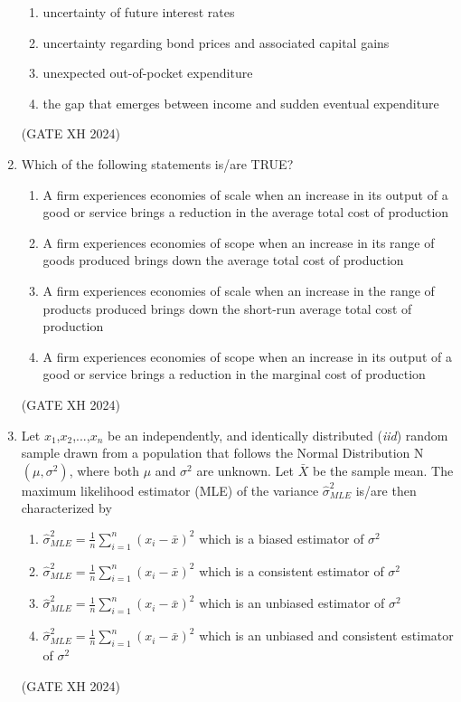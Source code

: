 \documentclass{article}
\begin{document}
\begin{enumerate}
    \begin{enumerate}
        \item uncertainty of future interest rates
        \item  uncertainty regarding bond prices and associated capital gains
        \item unexpected out-of-pocket expenditure
        \item the gap that emerges between income and sudden eventual expenditure
    \end{enumerate} \hfill (GATE XH 2024)

    \item Which of the following statements is/are TRUE?
    
    \begin{enumerate}
        \item A firm experiences economies of scale when an increase in its output of a good or service brings a reduction in the average total cost of production
        \item  A firm experiences economies of scope when an increase in its range of goods produced brings down the average total cost of production
        \item A firm experiences economies of scale when an increase in the range of products produced brings down the short-run average total cost of production
        \item A firm experiences economies of scope when an increase in its output of a good or service brings a reduction in the marginal cost of production
    \end{enumerate} \hfill (GATE XH 2024)

    \item Let $x_1$,$x_2$,...,$x_n$ be an independently, and identically distributed (\textit{iid}) random sample drawn from a population that follows the Normal Distribution N $(\mu, \sigma^2)$, where both $\mu$ and $\sigma^2$ are unknown. Let $\bar{X}$ be the sample mean. The maximum likelihood estimator (MLE) of the variance $\hat{\sigma}^2_{MLE}$ is/are then characterized by
    
    \begin{enumerate}
        \item $\hat{\sigma}^2_{MLE} =\frac{1}{n}\sum_{i=1}^{n}(x_i-\bar{x})^2$ which is a biased estimator of $\sigma^2$
        \item $\hat{\sigma}^2_{MLE} =\frac{1}{n}\sum_{i=1}^{n}(x_i-\bar{x})^2$ which is a consistent estimator of $\sigma^2$
        \item $\hat{\sigma}^2_{MLE} =\frac{1}{n}\sum_{i=1}^{n}(x_i-\bar{x})^2$ which is an unbiased estimator of $\sigma^2$
        \item $\hat{\sigma}^2_{MLE} =\frac{1}{n}\sum_{i=1}^{n}(x_i-\bar{x})^2$ which is an unbiased and consistent estimator of $\sigma^2$
    \end{enumerate} \hfill (GATE XH 2024)


\end{enumerate}
\end{document}
